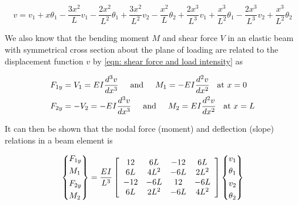 \documentclass[
10pt,
a4paper,
openany,
svgnames,
]{book}
\begin{document}
\[v = v_1 + x\theta_1 - \frac{3x^2}{L}v_1 - \frac{2x^2}{L^2}\theta_1 + \frac{3x^2}{L^2}v_2 - \frac{x^2}{L}\theta_2 + \frac{2x^3}{L^3}v_1 + \frac{x^3}{L^2}\theta_1 - \frac{2x^3}{L^3}v_2 + \frac{x^3}{L^2}\theta_2\]

We also know that the bending moment $M$ and shear force $V$ in an elastic beam with symmetrical cross section about the plane of loading are related to the displacement function $v$ by \cref{eqn: shear force and load intensity} as

\begin{gather*}
  F_{1y} = V_1 = EI\frac{d^3v}{dx^3} \hspace{0.5cm} \text{and} \hspace{0.5cm}
  M_1 =  -EI\frac{d^2v}{dx^2} \hspace{0.2cm} \text{ at }x = 0 \hfill \\
  F_{2y} =  -V_2 =  - EI\frac{d^3v}{dx^3} \hspace{0.5cm} \text{and}
  \hspace{0.5cm} M_2 = EI\frac{d^2v}{dx^2} \hspace{0.2cm} \text{ at }x = L \hfill \\ 
\end{gather*}

It can then be shown that the nodal force (moment) and deflection (slope) relations in a beam element is

\begin{equation}
  \left\{ \begin{gathered}
      F_{1y} \hfill \\
      M_1 \hfill \\
      F_{2y} \hfill \\
      M_2 \hfill \\ 
    \end{gathered}
  \right\} = \frac{EI}{L^3}
  \left[
    \begin{array}{*{20}{c}}
      12&6L&-12&6L \\ 
      6L&4L^2&-6L&2L^2 \\ 
      -12&-6L&12&-6L \\ 
      6L&2L^2&-6L&4L^2 
    \end{array}
  \right]
  \left\{
    \begin{gathered}
      v_1 \hfill \\
      \theta _1 \hfill \\
      v_2 \hfill \\
      \theta _2 \hfill \\ 
    \end{gathered}
  \right\}
\end{equation}
\end{document}

